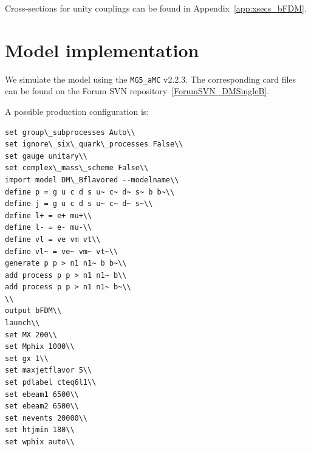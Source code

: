 Cross-sections for unity couplings can be found in Appendix~\ref{app:xsecs_bFDM}.

\section{Model implementation}


We simulate the model using the {\tt MG5\_aMC} v2.2.3. The corresponding card files can be found 
on the Forum SVN repository~\ref{ForumSVN_DMSingleB}.

A possible production configuration is:
\vspace{0.3cm}
\newline
\begin{verbatim}
set group\_subprocesses Auto\\
set ignore\_six\_quark\_processes False\\
set gauge unitary\\
set complex\_mass\_scheme False\\
import model DM\_Bflavored --modelname\\
define p = g u c d s u~ c~ d~ s~ b b~\\
define j = g u c d s u~ c~ d~ s~\\
define l+ = e+ mu+\\
define l- = e- mu-\\
define vl = ve vm vt\\
define vl~ = ve~ vm~ vt~\\
generate p p > n1 n1~ b b~\\
add process p p > n1 n1~ b\\
add process p p > n1 n1~ b~\\
\\
output bFDM\\
launch\\
set MX 200\\
set Mphix 1000\\
set gx 1\\
set maxjetflavor 5\\
set pdlabel cteq6l1\\
set ebeam1 6500\\
set ebeam2 6500\\
set nevents 20000\\
set htjmin 180\\
set wphix auto\\
\end{verbatim}
